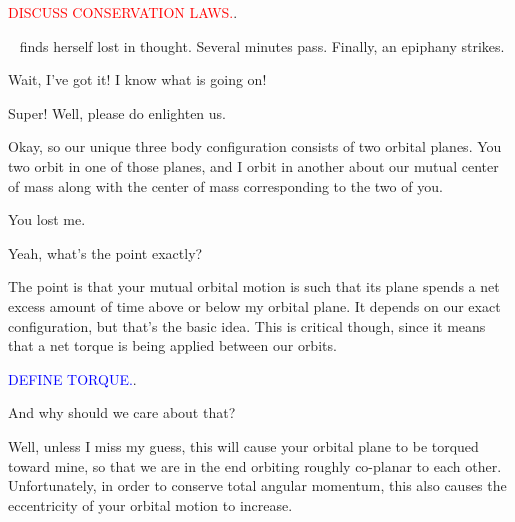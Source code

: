 \documentclass[main.tex]{subfiles}
\begin{document}
\begin{tcolorbox}[sharp corners, colback=red!30, colframe=red!80!blue, title=Conservation of Energy and Angular Momentum]
\par \textcolor{red}{DISCUSS CONSERVATION LAWS.}.  
\end{tcolorbox}

\par \nar \rmcelaeno~ finds herself lost in thought.  Several minutes pass.  Finally, an epiphany strikes.

\par \Celaeno  Wait, I've got it!  I know what is going on!

\par \Taygete  Super!  Well, please do enlighten us.

\par \Celaeno  Okay, so our unique three body configuration consists of two orbital planes.  You two orbit in one of those planes, and I orbit in another about our mutual center of mass along with the center of mass corresponding to the two of you.

\par \Alcyone  You lost me.

\par \Taygete Yeah, what's the point exactly?

\par \Celaeno The point is that your mutual orbital motion is such that its plane spends a net excess amount of time above or below my orbital plane.  It depends on our exact configuration, but that's the basic idea.  This is critical though, since it means that a net torque is being applied between our orbits.

\begin{tcolorbox}[sharp corners, colback=blue!30, colframe=blue!80!blue, title=Torque]
\par \textcolor{blue}{DEFINE TORQUE.}.  
\end{tcolorbox}

\par \Alcyone And why should we care about that?

\par \Celaeno Well, unless I miss my guess, this will cause your orbital plane to be torqued toward mine, so that we are in the end orbiting roughly co-planar to each other.  Unfortunately, in order to conserve total angular momentum, this also causes the eccentricity of your orbital motion to increase.  
\end{document}
